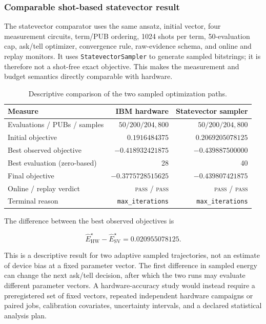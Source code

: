 \subsubsection{Comparable shot-based statevector result}

The statevector comparator uses the same ansatz, initial vector, four
measurement circuits, term/PUB ordering, 1024 shots per term, 50-evaluation
cap, ask/tell optimizer, convergence rule, raw-evidence schema, and online and
replay monitors.  It uses \texttt{StatevectorSampler} to generate sampled
bitstrings; it is therefore not a shot-free exact objective.  This makes the
measurement and budget semantics directly comparable with hardware.

\begin{table}[t]
  \centering
  \caption{Descriptive comparison of the two sampled optimization paths.}
  \label{tab:rv-hw-sv-comparison}
  \renewcommand{\arraystretch}{1.1}
  \begin{tabular}{p{}rr}
    \toprule
    Measure & IBM hardware & Statevector sampler \\
    \midrule
    Evaluations / PUBs / samples & $50/200/204{,}800$ & $50/200/204{,}800$ \\
    Initial objective & $0.1916484375$ & $0.2069205078125$ \\
    Best observed objective & $-0.418932421875$ & $-0.439887500000$ \\
    Best evaluation (zero-based) & 28 & 40 \\
    Final objective & $-0.3775728515625$ & $-0.439807421875$ \\
    Online / replay verdict & \textsc{pass} / \textsc{pass} & \textsc{pass} / \textsc{pass} \\
    Terminal reason & \texttt{max\_iterations} & \texttt{max\_iterations} \\
    \bottomrule
  \end{tabular}
\end{table}

The difference between the best observed objectives is

\begin{equation}
  \widehat{E}^{\star}_{\mathrm{HW}}
  -\widehat{E}^{\star}_{\mathrm{SV}}
  =0.020955078125.
  \label{eq:rv-best-difference}
\end{equation}

This is a descriptive result for two adaptive sampled trajectories, not an
estimate of device bias at a fixed parameter vector.  The first difference in
sampled energy can change the next ask/tell decision, after which the two runs
may evaluate different parameter vectors.  A hardware-accuracy study would
instead require a preregistered set of fixed vectors, repeated independent
hardware campaigns or paired jobs, calibration covariates, uncertainty
intervals, and a declared statistical analysis plan.

